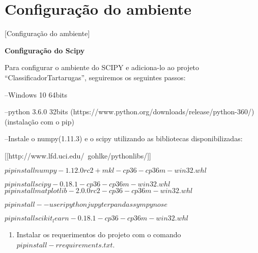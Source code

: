 
\chapter{Configuração do ambiente}[Configuração do ambiente]

\noindent \textbf{Configuração do Scipy}

\par Para configurar o ambiente do SCIPY e adiciona-lo ao projeto ``ClassificadorTartarugas'', seguiremos os seguintes passos:

--Windows 10 64bits

--python 3.6.0 32bits (https://www.python.org/downloads/release/python-360/) (instalação com o pip)

--Instale o numpy(1.11.3) e o scipy utilizando as bibliotecas disponibilizadas: 

[[http://www.lfd.uci.edu/~gohlke/pythonlibs/]]

$ pip install numpy-1.12.0rc2+mkl-cp36-cp36m-win32.whl$

$ pip install scipy-0.18.1-cp36-cp36m-win32.whl
$
$ pip install matplotlib-2.0.0rc2-cp36-cp36m-win32.whl$

$ pip install --user ipython jupyter pandas sympy nose$

$ pip install scikit_learn-0.18.1-cp36-cp36m-win32.whl$

\begin{enumerate}

\item Instalar os requerimentos do projeto com o comando $ pip install -r requirements.txt$.


\end{enumerate}
